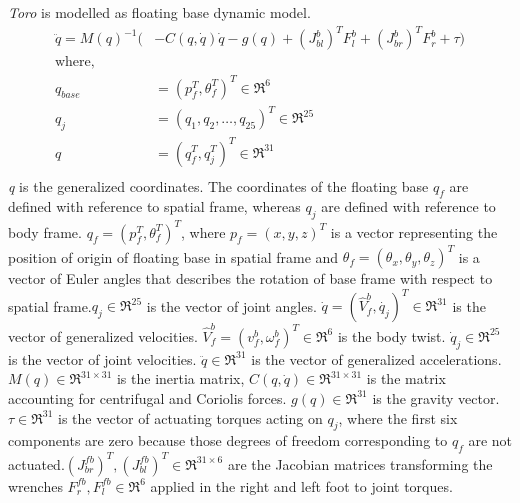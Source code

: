 \emph{Toro} is modelled as floating base dynamic model.
\begin{equation}
	\label{eq:motion}
	\begin{split}
	\ddot{q} = M(q)^{-1}(&-C(q,\dot{q})\dot{q} - g(q) + (J_{bl}^{b})^{T}F_{l}^{b} +(J_{br}^{b})^{T}F_{r}^{b} + \tau) \\
	\text{where,}\\
	q_{base} &= (p_{f}^{T},\theta_{f}^{T})^{T} \in \Re^{6} \\
	q_{j} &= (q_{1},q_{2},\ldots , q_{25})^{T} \in \Re^{25}\\
	q &= (q_{f}^{T}, q_{j}^{T})^{T} \in \Re^{31}\\
	\end{split}
\end{equation}
\emph{q} is the generalized coordinates. The coordinates of the floating base $q_{f}$ are defined with reference to spatial frame, whereas $q_{j}$ are defined with reference to body frame. $q_{f} = (p_{f}^{T},\theta_{f}^{T})^{T}$, where $p_{f}=(x,y,z)^{T}$ is a vector representing  the position of origin of floating base in spatial frame and $\theta_{f}=(\theta_{x},\theta_{y},\theta_{z})^{T}$ is a vector of Euler angles that describes the rotation of base frame with respect to spatial frame.$q_{j} \in \Re^{25}$ is the vector of joint angles. $\dot{q} =  (\hat{V}_{f}^{b},\dot{q_{j}})^{T} \in \Re^{31}$ is the vector of generalized velocities. $\hat{V}_{f}^{b} = (v_f^b,\omega_f^b)^T \in \Re^{6}$ is the body twist. $\dot{q}_{j} \in \Re^{25}$ is the vector of joint velocities. $\ddot{q}\in \Re^{31}$ is the vector of generalized accelerations. $M(q)\in \Re^{31 \times 31}$ is the inertia matrix, $C(q,\dot{q})\in \Re^{31 \times 31}$ is the matrix accounting for centrifugal and Coriolis forces. $g(q) \in \Re^{31}$ is the gravity vector. $\tau \in \Re^{31}$ is the vector of actuating torques acting on $q_{j}$, where the first six components are zero because those degrees of freedom corresponding to $q_{f}$ are not actuated.$(J_{br}^{fb})^{T},(J_{bl}^{fb})^{T} \in \Re^{31 \times 6}$ are the Jacobian matrices transforming the wrenches $F_{r}^{fb},F_{l}^{fb} \in \Re^{6}$ applied in the right and left foot to joint torques.
